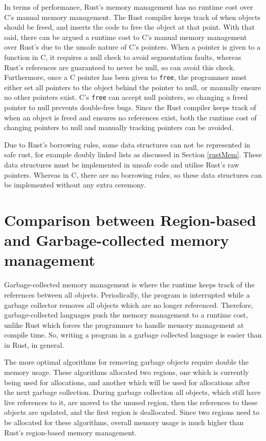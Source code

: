 \documentclass[10pt,a4paper,twocolumn]{article}
\begin{document}
In terms of performance, Rust's memory management has no runtime cost over C's manual memory
management.
The Rust compiler keeps track of when objects should be freed, and inserts the code to free the
object at that point.
With that said, there can be argued a runtime cost to C's manual memory management over Rust's
due to the unsafe nature of C's pointers.
When a pointer is given to a function in C, it requires a null check to avoid segmentation faults,
whereas Rust's references are guaranteed to never be null, so can avoid this check.
Furthermore, once a C pointer has been given to \lstinline{free}, the programmer must either set
all pointers to the object behind the pointer to null, or manually ensure no other pointers exist.
C's \lstinline{free} can accept null pointers, so changing a freed pointer to null prevents
double-free bugs.
Since the Rust compiler keeps track of when an object is freed and ensures no references exist,
both the runtime cost of changing pointers to null and manually tracking pointers can be avoided.

Due to Rust's borrowing rules, some data structures can not be represented in safe rust, for
example doubly linked lists as discussed in Section \ref{rustMem}.
These data structures must be implemented in unsafe code and utilise Rust's raw pointers.
Whereas in C, there are no borrowing rules, so these data structures can be implemented without
any extra ceremony.

\section{Comparison between Region-based and Garbage-collected memory management}

Garbage-collected memory management is where the runtime keeps track of the references between all
objects.
Periodically, the program is interrupted while a garbage collector removes all objects which are no
longer referenced.
Therefore, garbage-collected languages push the memory management to a runtime cost, unlike Rust
which forces the programmer to handle memory management at compile time.
So, writing a program in a garbage collected language is easier than in Rust, in general.

The more optimal algorithms for removing garbage objects require double the memory usage.
These algorithms allocated two regions, one which is currently being used for allocations, and
another which will be used for allocations after the next garbage collection.
During garbage collection all objects, which still have live references to it, are moved to the
unused region, then the references to these objects are updated, and the first region is
deallocated.
Since two regions need to be allocated for these algorithms, overall memory usage is much higher
than Rust's region-based memory management.
\end{document}
